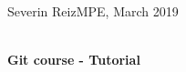 \documentclass[11pt]{article}
\begin{document}
  {\normalsize  
Severin Reiz\hfill MPE, March 2019\\ 
    \mbox{}\\ [2ex] }

\thispagestyle{empty}
\begin{center}
    {\LARGE\sffamily\bfseries Git course - Tutorial}
\end{center}
\end{document}
